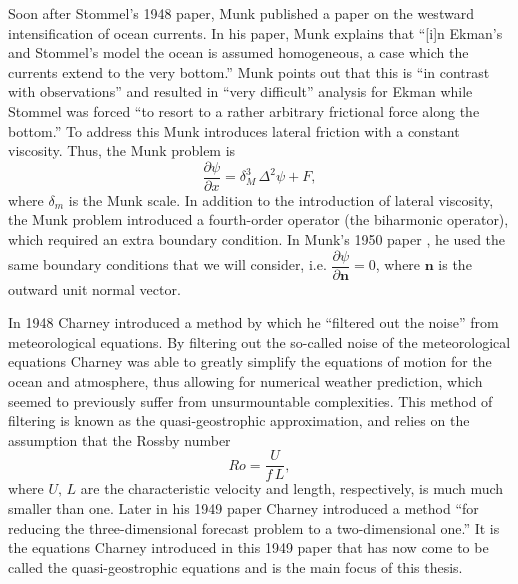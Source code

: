 Soon after Stommel's 1948 paper, Munk \cite{Munk1950} published a paper on the
westward intensification of ocean currents. In his paper, Munk explains that
``[i]n Ekman's and Stommel's model the ocean is assumed homogeneous, a case
which the currents extend to the very bottom.'' Munk points out that this is
``in contrast with observations'' and resulted in ``very difficult'' analysis
for Ekman while Stommel was forced ``to resort to a rather arbitrary frictional
force along the bottom.'' To address this Munk introduces lateral friction with
a constant viscosity. Thus, the Munk problem is
\cite{Fox-Kemper2003,Munk1950,Vallis06}
\begin{equation}
  \frac{\partial \psi}{\partial x} = \delta_M^3\, \Delta^2 \psi + F,
  \label{eqn:MunkProblem}
\end{equation}
where $\delta_m$ is the Munk scale. In addition to the introduction of lateral
viscosity, the Munk problem introduced a fourth-order operator (the biharmonic
operator), which required an extra boundary condition.  In Munk's 1950
paper \cite{Munk1950}, he used the same boundary conditions that we will
consider, i.e. $\dfrac{\partial \psi}{\partial \mathbf{n}} = 0$, where
$\mathbf{n}$ is the outward unit normal vector.

In 1948 Charney \cite{Charney1948} introduced a method by which he ``filtered out
the noise'' from meteorological equations. By filtering out the so-called noise
of the meteorological equations Charney was able to greatly simplify the
equations of motion for the ocean and atmosphere, thus allowing for numerical
weather prediction, which seemed to previously suffer from unsurmountable
complexities. This method of filtering is known as the quasi-geostrophic
approximation, and relies on the assumption that the Rossby number
\begin{equation}
  Ro = \frac{U}{f\, L},
  \label{eqn:RossbyNumber}
\end{equation}
where $U,\, L$ are the characteristic velocity and length, respectively, is
much much smaller than one. Later in his 1949 paper \cite{Charney1949} Charney
introduced a method ``for reducing the three-dimensional forecast problem to a
two-dimensional one.'' It is the equations Charney introduced in this 1949 paper
that has now come to be called the quasi-geostrophic equations and is the main
focus of this thesis.
